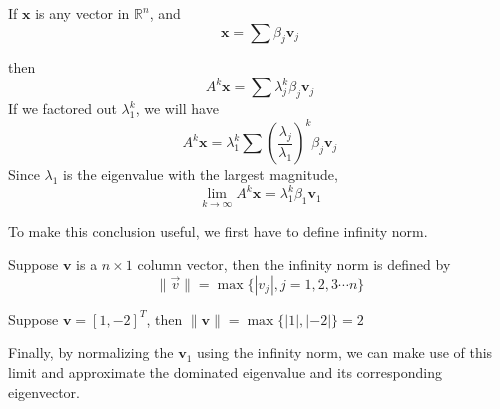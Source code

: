 If $\mathbf{x}$ is any vector in $\mathbb{R}^n$, and
\[ \mathbf{x} = \sum \beta_j\mathbf{v}_j \]

then 
\[ A^k\mathbf{x} = \sum \lambda_j^k\beta_j\mathbf{v}_j \]
If we factored out $\lambda_1^k$, we will have
\[ A^k\mathbf{x} = \lambda_1^k \sum \left(\frac{\lambda_j}{\lambda_1}\right)^k\beta_j\mathbf{v}_j \]
Since $\lambda_1$ is the eigenvalue with the largest magnitude, 
\[ \lim_{k\to\infty} A^k\mathbf{x} = \lambda_1^k\beta_1\mathbf{v}_1 \]

To make this conclusion useful, we first have to define infinity norm.
\begin{definition}
	Suppose $\mathbf{v}$ is a $n\times 1$ column vector, then the infinity norm is defined by
	\[ \|\vec{v}\| = \max\{ |v_j|, j=1,2,3\cdots n \} \]
\end{definition}
\begin{ex}
	Suppose $\mathbf{v} = [1,-2]^T$, then $\|\mathbf{v}\| = \max\{ |1|, |-2| \} = 2$
\end{ex}

Finally, by normalizing the $\mathbf{v}_1$ using the infinity norm, we can make use of this limit and approximate the dominated eigenvalue and its corresponding eigenvector.

